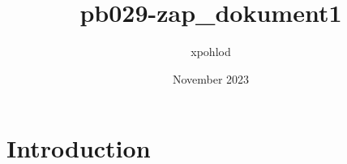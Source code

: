 \documentclass{article}
\title{pb029-zap_dokument1}
\author{xpohlod }
\date{November 2023}
\begin{document}
\maketitle

\section{Introduction}
\end{document}
